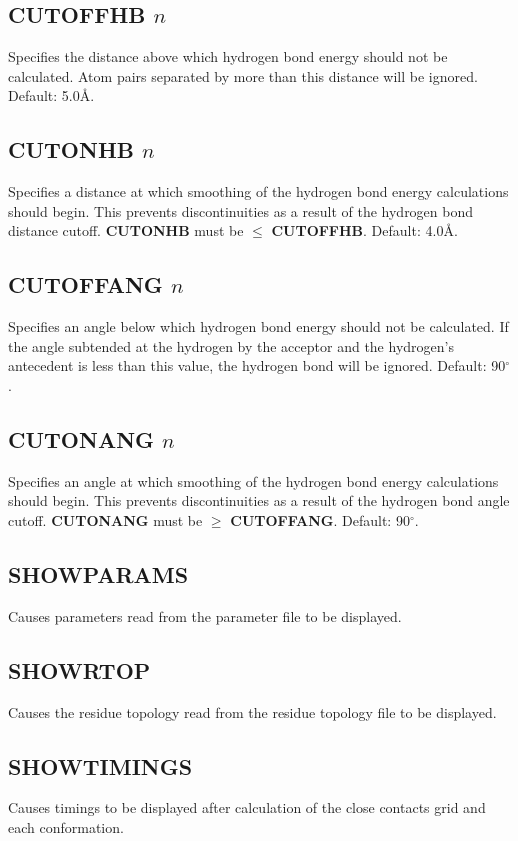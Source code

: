 \documentclass[12pt]{article}
\newcommand{\degree}{\mbox{${}^\circ$}}
\begin{document}
\subsection{CUTOFFHB $n$}
Specifies the distance above which hydrogen bond energy should not be
calculated. Atom pairs separated by more than this distance will be
ignored. Default: 5.0\AA.

\subsection{CUTONHB $n$}
Specifies a distance at which smoothing of the hydrogen bond energy
calculations should begin. This prevents discontinuities as a result
of the hydrogen bond distance cutoff. {\bf CUTONHB} must be $\le$ {\bf
CUTOFFHB}. Default: 4.0\AA.

\subsection{CUTOFFANG $n$}
Specifies an angle below which hydrogen bond energy should not be
calculated. If the angle subtended at the hydrogen by the acceptor and
the hydrogen's antecedent is less than this value, the hydrogen bond
will be ignored. Default: 90\degree.

\subsection{CUTONANG $n$}
Specifies an angle at which smoothing of the hydrogen bond energy
calculations should begin. This prevents discontinuities as a result
of the hydrogen bond angle cutoff. {\bf CUTONANG} must be $\ge$ {\bf
CUTOFFANG}. Default: 90\degree.

\subsection{SHOWPARAMS}
Causes parameters read from the parameter file to be displayed.

\subsection{SHOWRTOP}
Causes the residue topology read from the residue topology file to be
displayed.

\subsection{SHOWTIMINGS}
Causes timings to be displayed after calculation of the close contacts
grid and each conformation.
\end{document}
